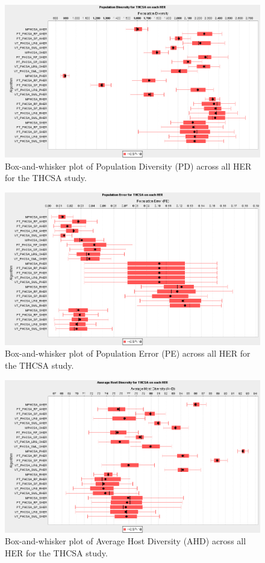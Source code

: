 \begin{figure}[htp]
	\centering
		\includegraphics[scale=0.80]{Hosts/THCSA-PD}
	\caption{Box-and-whisker plot of Population Diversity (PD) across all HER for the THCSA study.}
	\label{fig:hosts:thcsa:pd:boxplot}
\end{figure}

\begin{figure}[htp]
	\centering
		\includegraphics[scale=0.80]{Hosts/THCSA-PE}
	\caption{Box-and-whisker plot of Population Error (PE) across all HER for the THCSA study.}
	\label{fig:hosts:thcsa:pe:boxplot}
\end{figure}

\begin{figure}[htp]
	\centering
		\includegraphics[scale=0.80]{Hosts/THCSA-AHD}
	\caption{Box-and-whisker plot of Average Host Diversity (AHD) across all HER for the THCSA study.}
	\label{fig:hosts:thcsa:ahd:boxplot}
\end{figure}

